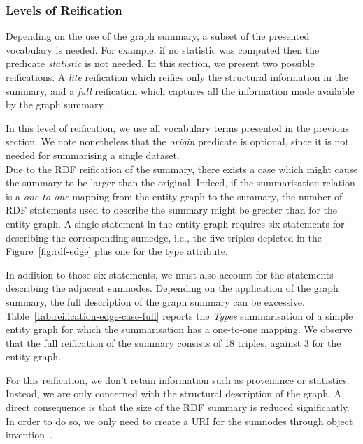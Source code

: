 \subsubsection{Levels of Reification}

Depending on the use of the graph summary, a subset of the presented vocabulary is needed. For example, if no statistic was computed then the predicate \emph{statistic} is not needed. In this section, we present two possible reifications. A \emph{lite} reification which reifies only the structural information in the summary, and a \emph{full} reification which captures all the information made available by the graph summary.


In this level of reification, we use all vocabulary terms presented in the previous section. We note nonetheless that the \emph{origin} predicate is optional, since it is not needed for summarising a single dataset.\\

Due to the RDF reification of the summary, there exists a case which might cause the summary to be larger than the original. Indeed, if the summarisation relation is a \emph{one-to-one} mapping from the entity graph to the summary, the number of RDF statements used to describe the summary might be greater than for the entity graph. A single statement in the entity graph requires six statements for describing the corresponding sumedge, i.e., the five triples depicted in the Figure~\ref{fig:rdf-edge} plus one for the type attribute.

In addition to those six statements, we must also account for the statements describing the adjacent sumnodes. Depending on the application of the graph summary, the full description of the graph summary can be excessive.\\

Table~\ref{tab:reification-edge-case-full} reports the \emph{Types} summarisation of a simple entity graph for which the summarisation has a one-to-one mapping. We observe that the full reification of the summary consists of 18 triples, against 3 for the entity graph.


For this reification, we don't retain information such as provenance or statistics. Instead, we are only concerned with the structural description of the graph. A direct consequence is that the size of the RDF summary is reduced significantly. In order to do so, we only need to create a URI for the sumnodes through object invention~\cite{hull:1989:usi}.

